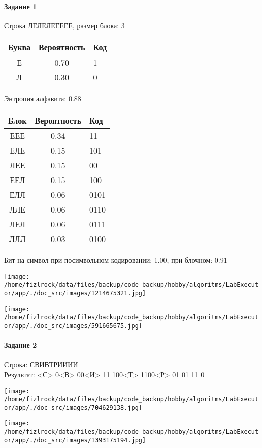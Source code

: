 \documentclass[a4paper, 12pt]{article}
\begin{document}
\paragraph{Задание 1}

Строка ЛЕЛЕЛЕЕЕЕЕ, размер блока: 3
\begin{center}
 \begin{tabular}{ |c|c|l| } 
  \hline
     Буква & Вероятность & Код\\ \hline
Е & 0.70 & 1\\\hline
Л & 0.30 & 0
\\ \hline \end{tabular}
\end{center}
Энтропия алфавита: 0.88
\begin{center}
 \begin{tabular}{ |c|c|l| } 
  \hline
     Блок & Вероятность & Код\\ \hline
ЕЕЕ & 0.34 & 11\\\hline
ЕЛЕ & 0.15 & 101\\\hline
ЛЕЕ & 0.15 & 00\\\hline
ЕЕЛ & 0.15 & 100\\\hline
ЕЛЛ & 0.06 & 0101\\\hline
ЛЛЕ & 0.06 & 0110\\\hline
ЛЕЛ & 0.06 & 0111\\\hline
ЛЛЛ & 0.03 & 0100
\\ \hline \end{tabular}
\end{center}
Бит на символ при посимвольном кодировании: 1.00, при блочном: 0.91

\texttt{[image: /home/fizlrock/data/files/backup/code\_backup/hobby/algoritms/LabExecutor/app/./doc\_src/images/1214675321.jpg]}

\texttt{[image: /home/fizlrock/data/files/backup/code\_backup/hobby/algoritms/LabExecutor/app/./doc\_src/images/591665675.jpg]}
\pagebreak
\paragraph{Задание 2}

Строка: 
СВИВТРИИИИ\\
Результат: <С> 0<В> 00<И> 11 100<Т> 1100<Р> 01 01 11 0

\texttt{[image: /home/fizlrock/data/files/backup/code\_backup/hobby/algoritms/LabExecutor/app/./doc\_src/images/704629138.jpg]}

\texttt{[image: /home/fizlrock/data/files/backup/code\_backup/hobby/algoritms/LabExecutor/app/./doc\_src/images/1393175194.jpg]}
\end{document}
